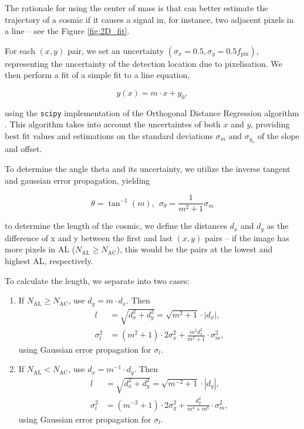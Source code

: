 \documentclass[a4paper, 11pt]{article}
\begin{document}
The rationale for using the center of mass is that can better estimate the trajectory of a cosmic if it causes a signal in, for instance, two adjacent pixels in a line -- see the Figure \ref{fig:2D_fit}. 

For each $(x,y)$ pair, we set an uncertainty $(\sigma_x = 0.5, \sigma_y = 0.5 f_\mathrm{pix})$, representing the uncertainty of the detection location due to pixelisation. We then perform a fit of a simple fit to a line equation,

\begin{equation}
  y(x) = m \cdot x + y_0,
\end{equation}

using the \texttt{scipy} implementation of the Orthogonal Distance Regression algorithm \cite{ODR}. This algorithm takes into account the uncertaintes of both $x$ and $y$, providing best fit values and estimations on the standard deviations $\sigma_m$ and $\sigma_{y_o}$ of the slope and offset.

To determine the angle theta and its uncertainty, we utilize the inverse tangent and gaussian error propagation, yielding

\begin{equation}
  \theta = \tan^{-1}\left( m \right), ~~ \sigma_\theta = \frac{1}{m^{2}+1} \sigma_m
\end{equation}

to determine the length of the cosmic, we define the distances $d_x$ and $d_y$ as the difference of x and y between the first and last $(x,y)$ pairs -- if the image has more pixels in AL ($N_\mathrm{AL} \geq N_\mathrm{AC}$), this would be the pairs at the lowest and highest AL, respectively.

To calculate the length, we separate into two cases:
\begin{enumerate}
  \item If $N_\mathrm{AL} \geq N_\mathrm{AC}$, use $d_y = m \cdot d_x$. Then
    \begin{align}
      l &= \sqrt{d_x^{2} + d_y^{2}} = \sqrt{m^{2} + 1} \cdot |d_x|,\\
      \sigma_l^{2} &= \left( m^{2} + 1 \right) \cdot 2 \sigma_x^{2} + \frac{m^{2} d_x^{2}}{m^{2}+1}  \cdot \sigma_m^{2},
    \end{align}
    using Gaussian error propagation for $\sigma_l$.
  \item If $N_\mathrm{AL} < N_\mathrm{AC}$, use $d_x = m^{-1} \cdot d_y$. Then
    \begin{align}
      l &= \sqrt{d_x^{2} + d_y^{2}} = \sqrt{m^{-2} + 1} \cdot |d_y|,\\
      \sigma_l^{2} &= \left( m^{-2} + 1 \right) \cdot 2 \sigma_y^{2} + \frac{d_y^{2}}{m^{4}+m^{6}}  \cdot \sigma_m^{2},
    \end{align}
    using Gaussian error propagation for $\sigma_l$.
\end{enumerate}
\end{document}
